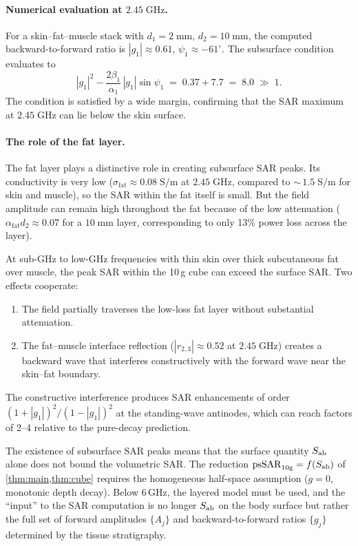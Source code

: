 \paragraph{Numerical evaluation at $2.45\;\mathrm{GHz}$.}
For a skin--fat--muscle stack with $d_1 = 2\;\mathrm{mm}$,
$d_2 = 10\;\mathrm{mm}$, the computed backward-to-forward ratio is
$|g_1| \approx 0.61$, $\psi_1 \approx -61^\circ$.  The subsurface
condition evaluates to
\[
  |g_1|^2 - \frac{2\beta_1}{\alpha_1}\,|g_1|\sin\psi_1
  \;=\; 0.37 + 7.7
  \;=\; 8.0 \;\gg\; 1.
\]
The condition is satisfied by a wide margin, confirming that the SAR
maximum at $2.45\;\mathrm{GHz}$ can lie below the skin surface.

\paragraph{The role of the fat layer.}
The fat layer plays a distinctive role in creating subsurface SAR
peaks.  Its conductivity is very low ($\sigma_{\mathrm{fat}} \approx
0.08\;\mathrm{S/m}$ at $2.45\;\mathrm{GHz}$, compared to
${\sim}\,1.5\;\mathrm{S/m}$ for skin and muscle), so the SAR within the
fat itself is small.  But the field amplitude can remain high throughout
the fat because of the low attenuation ($\alpha_{\mathrm{fat}} d_2
\approx 0.07$ for a $10\;\mathrm{mm}$ layer, corresponding to only
13\% power loss across the layer).

\begin{theorem}\label{thm:subsurface}
At sub-GHz to low-GHz frequencies with thin skin over thick
subcutaneous fat over muscle, the peak SAR within the 10\,g cube can
exceed the surface SAR.  Two effects cooperate:
\begin{enumerate}[nosep]
\item The field partially traverses the low-loss fat layer without
  substantial attenuation.
\item The fat--muscle interface reflection ($|r_{2,3}| \approx 0.52$ at
  $2.45\;\mathrm{GHz}$) creates a backward wave that interferes
  constructively with the forward wave near the skin--fat boundary.
\end{enumerate}
The constructive interference produces SAR enhancements of order
$(1 + |g_1|)^2/(1 - |g_1|)^2$ at the standing-wave antinodes, which can
reach factors of 2--4 relative to the pure-decay prediction.
\end{theorem}

\begin{remark}
The existence of subsurface SAR peaks means that the surface quantity
$S_{\mathrm{ab}}$ alone does not bound the volumetric SAR.  The reduction
$\mathrm{psSAR}_{10\mathrm{g}} = f(S_{\mathrm{ab}})$ of \cref{thm:main,thm:cube} requires the
homogeneous half-space assumption ($g = 0$, monotonic depth decay).
Below 6\,GHz, the layered model must be used, and the ``input'' to the
SAR computation is no longer $S_{\mathrm{ab}}$ on the body surface but rather the
full set of forward amplitudes $\{A_j\}$ and backward-to-forward ratios
$\{g_j\}$ determined by the tissue stratigraphy.
\end{remark}


